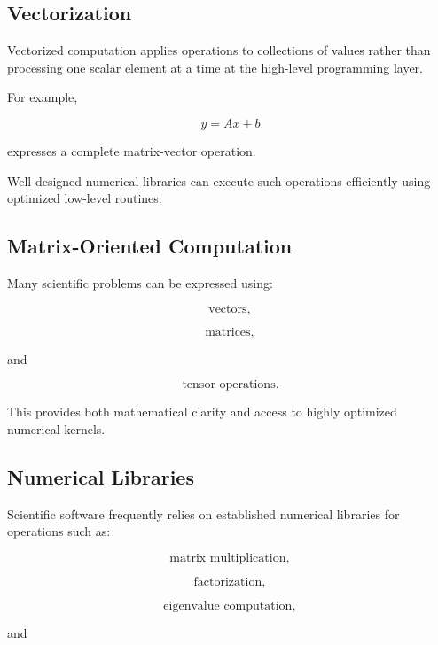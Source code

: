 \subsection{Vectorization}
\label{subsec:scientific-vectorization}

Vectorized computation applies operations to collections of values rather
than processing one scalar element at a time at the high-level programming
layer.

For example,

\[
\boxed{
y
=
Ax+b
}
\]

expresses a complete matrix-vector operation.

Well-designed numerical libraries can execute such operations efficiently
using optimized low-level routines.

\subsection{Matrix-Oriented Computation}
\label{subsec:matrix-oriented-computation}

Many scientific problems can be expressed using:

\[
\boxed{
\text{vectors},
}
\]

\[
\boxed{
\text{matrices},
}
\]

and

\[
\boxed{
\text{tensor operations}.
}
\]

This provides both mathematical clarity and access to highly optimized
numerical kernels.

\subsection{Numerical Libraries}
\label{subsec:numerical-libraries}

Scientific software frequently relies on established numerical libraries
for operations such as:

\[
\boxed{
\text{matrix multiplication},
}
\]

\[
\boxed{
\text{factorization},
}
\]

\[
\boxed{
\text{eigenvalue computation},
}
\]

and

